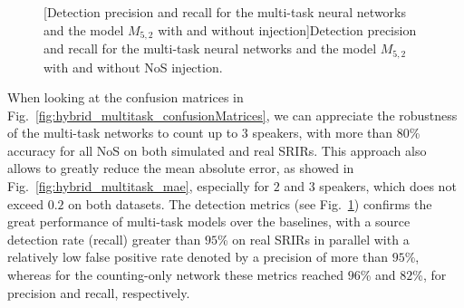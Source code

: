 \begin{figure}[t]
    \centering
    \begin{adjustbox}{width=1.2\textwidth,center}
    \end{adjustbox}
    [Detection precision and recall for the multi-task neural networks and the model $M_{5,2}$ with and without injection]{Detection precision and recall for the multi-task neural networks and the model $M_{5,2}$ with and without NoS injection.}
    \label{fig:hybrid_multitask_prediction}
\end{figure}



\clearpage
When looking at the confusion matrices in Fig.~\ref{fig:hybrid_multitask_confusionMatrices}, we can appreciate the robustness of the multi-task networks to count up to $3$ speakers, with more than $80$\% accuracy for all NoS on both simulated and real SRIRs. This approach also allows to greatly reduce the mean absolute error, as showed in Fig.~\ref{fig:hybrid_multitask_mae}, especially for $2$ and $3$ speakers, which does not exceed $0.2$ on both datasets. The detection metrics (see Fig.~\ref{fig:hybrid_multitask_prediction}) confirms the great performance of multi-task models over the baselines, with a source detection rate (recall) greater than $95$\% on real SRIRs in parallel with a relatively low false positive rate denoted by a precision of more than $95$\%, whereas for the counting-only network these metrics reached $96$\% and $82$\%, for precision and recall, respectively.

